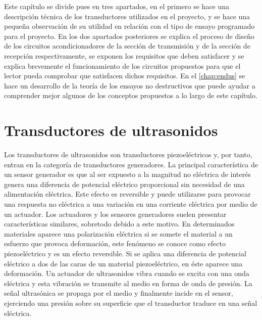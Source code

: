 Este capítulo se divide pues en tres apartados, en el primero se hace una
descripción técnica de los transductores utilizados en el proyecto, y se
hace una pequeña observación de su utilidad en relación con el tipo de
ensayo programado para el proyecto. En los dos apartados posteriores se
explica el proceso de diseño de los circuitos acondicionadores de la
sección de transmisión y de la sección de recepción respectivamente, se
exponen los requisitos que deben satisfacer y se explica brevemente el
funcionamiento de los circuitos propuestos para que el lector pueda
comprobar que satisfacen dichos requisitos. En el \cref{chap:endus} se hace
un desarrollo de la teoría de los ensayos no destructivos que puede ayudar
a comprender mejor algunos de los conceptos propuestos a lo largo de este
capítulo.


\section{Transductores de ultrasonidos}\label{sec:transducers}

Los transductores de ultrasonidos son transductores piezoeléctricos y, por
tanto, entran en la categoría de transductores generadores. La principal
característica de un sensor generador es que al ser expuesto a la magnitud
no eléctrica de interés genera una diferencia de potencial eléctrico
proporcional sin necesidad de una alimentación eléctrica. Este efecto es
reversible y puede utilizarse para provocar una respuesta no eléctrica a
una variación en una corriente eléctrica por medio de un actuador. Los
actuadores y los sensores generadores suelen presentar características
similares, sobretodo debido a este motivo. En determinados materiales
aparece una polarización eléctrica si se somete el material a un esfuerzo
que provoca deformación, este fenómeno se conoce como efecto piezoeléctrico
y es un efecto reversible. Si se aplica una diferencia de potencial
eléctrico a dos de las caras de un material piezoeléctrico, en éste aparece
una deformación. Un actuador de ultrasonidos vibra cuando se excita con una
onda eléctrica y esta vibración se transmite al medio en forma de onda de
presión. La señal ultrasónica se propaga por el medio y finalmente incide
en el sensor, ejerciendo una presión sobre su superficie que el transductor
traduce en una señal eléctrica.


